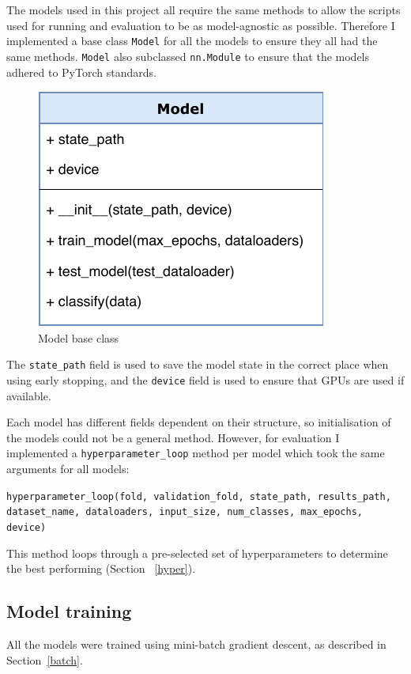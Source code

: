 The models used in this project all require the same methods to allow the scripts used for running and evaluation to be as 
model-agnostic as possible. Therefore I implemented a base class \texttt{Model} for all the models to ensure they all had the same methods.
\texttt{Model} also subclassed \texttt{nn.Module} to ensure that the models adhered to PyTorch standards.
\begin{figure}[H]
  \centering
  \includegraphics[scale=0.75]{figs/model_class.pdf}
  \caption{Model base class}
\end{figure}

The \texttt{state\_path} field is used to save the model state in the correct place when using early stopping, and the \texttt{device} field is 
used to ensure that GPUs are used if available.

Each model has different fields dependent on their structure, so initialisation of the models could not be a general method. 
However, for evaluation I implemented a \texttt{hyperparameter\_loop} method per model 
which took the same arguments for all models:
\begin{center}
  \texttt{hyperparameter\_loop(fold, validation\_fold, state\_path, results\_path, dataset\_name, dataloaders, input\_size, num\_classes, max\_epochs, device)}
\end{center}

This method loops through a pre-selected set of hyperparameters to determine the best performing (Section ~\ref{hyper}).

\subsection{Model training}

All the models were trained using mini-batch gradient descent, as described in Section~\ref{batch}.

